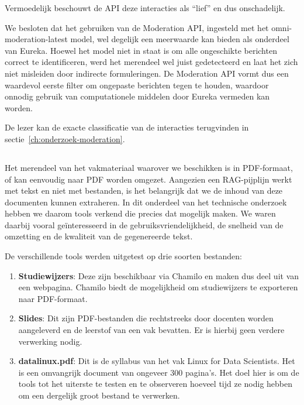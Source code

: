 Vermoedelijk beschouwt de API deze interacties als ``lief'' en dus onschadelijk.

We besloten dat het gebruiken van de Moderation API, ingesteld met het omni-moderation-latest model, wel degelijk een meerwaarde kan bieden als onderdeel van Eureka. Hoewel het model niet in staat is om alle ongeschikte berichten correct te identificeren, werd het merendeel wel juist gedetecteerd en laat het zich niet misleiden door indirecte formuleringen. De Moderation API vormt dus een waardevol eerste filter om ongepaste berichten tegen te houden, waardoor onnodig gebruik van computationele middelen door Eureka vermeden kan worden.

De lezer kan de exacte classificatie van de interacties terugvinden in sectie~\ref{ch:onderzoek-moderation}.

\subsection{}%
\label{subsec:onderzoek-tekstextractie}

Het merendeel van het vakmateriaal waarover we beschikken is in PDF-formaat, of kan eenvoudig naar PDF worden omgezet. Aangezien een RAG-pijplijn werkt met tekst en niet met bestanden, is het belangrijk dat we de inhoud van deze documenten kunnen extraheren. In dit onderdeel van het technische onderzoek hebben we daarom tools verkend die precies dat mogelijk maken. We waren daarbij vooral geïnteresseerd in de gebruiksvriendelijkheid, de snelheid van de omzetting en de kwaliteit van de gegenereerde tekst.

De verschillende tools werden uitgetest op drie soorten bestanden:

\begin{enumerate} 
    \item \textbf{Studiewijzers}: Deze zijn beschikbaar via Chamilo en maken dus deel uit van een webpagina. Chamilo biedt de mogelijkheid om studiewijzers te exporteren naar PDF-formaat.
    \item \textbf{Slides}: Dit zijn PDF-bestanden die rechtstreeks door docenten worden aangeleverd en de leerstof van een vak bevatten. Er is hierbij geen verdere verwerking nodig.
    \item \textbf{datalinux.pdf}: Dit is de syllabus van het vak Linux for Data Scientists. Het is een omvangrijk document van ongeveer 300 pagina’s. Het doel hier is om de tools tot het uiterste te testen en te observeren hoeveel tijd ze nodig hebben om een dergelijk groot bestand te verwerken.
\end{enumerate}

